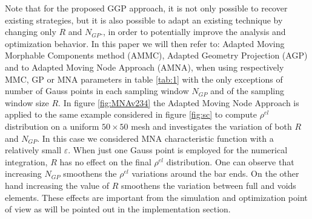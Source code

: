 Note that for the proposed GGP approach, it is not only possible to recover existing strategies, but it is also possible to adapt an existing technique by changing only $R$ and $N_{GP}$., in order to potentially improve the analysis and optimization behavior.
  In this paper we will then refer to: Adapted Moving Morphable Components method (AMMC), Adapted Geometry Projection (AGP) and to Adapted Moving Node Approach (AMNA), when using respectively MMC, GP or MNA parameters in table \ref{tab:1} with the only exceptions of  number of Gauss points in each sampling window $N_{GP}$ and of the sampling window size $R$. In figure \ref{fig:MNAv234} the Adapted Moving Node Approach is applied to the same example considered in figure \ref{fig:sc} to compute $\rho^{el}$ distribution on a uniform $50\times 50$ mesh and investigates the variation of both $R$ and $N_{GP}$.
  In this case we considered MNA characteristic function with a relatively small $\varepsilon$. When just one Gauss point is employed for the numerical integration, $R$ has no effect on the final $\rho^{el}$ distribution. One can observe that increasing $N_{GP}$ smoothens the $\rho^{el}$ variations around the bar ends. On the other hand increasing the value of $R$ smoothens the variation between full and voids elements. These effects are important from the simulation and optimization point of view as will be pointed out in the implementation section.

